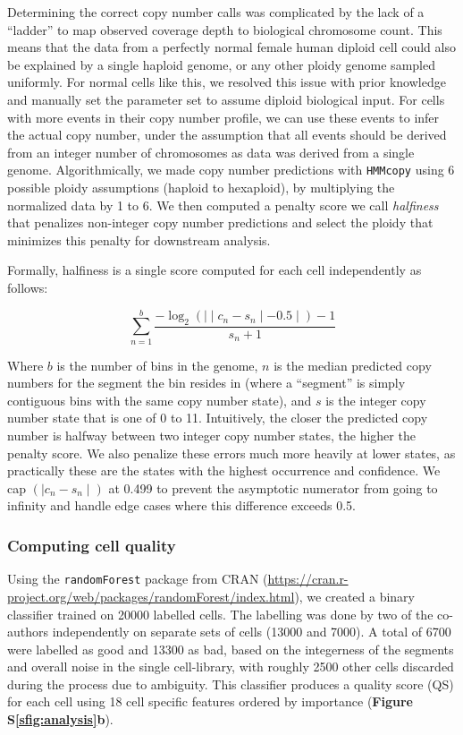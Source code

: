\documentclass{article}
\newcommand{\refsupfig}[2][]{\textbf{Figure S}\textbf{\ref{#2}}{#1}}
\begin{document}
Determining the correct copy number calls was complicated by the lack of a ``ladder'' to map observed coverage depth to biological chromosome count. This means that the data from a perfectly normal female human diploid cell could also be explained by a single haploid genome, or any other ploidy genome sampled uniformly. For normal cells like this, we resolved this issue with prior knowledge and manually set the parameter set to assume diploid biological input. For cells with more events in their copy number profile, we can use these events to infer the actual copy number, under the assumption that all events should be derived from an integer number of chromosomes as data was derived from a single genome. Algorithmically, we made copy number predictions with \texttt{HMMcopy} using 6 possible ploidy assumptions (haploid to hexaploid), by multiplying the normalized data by 1 to 6. We then computed a penalty score we call \textit{halfiness} that penalizes non-integer copy number predictions and select the ploidy that minimizes this penalty for downstream analysis.

Formally, halfiness is a single score computed for each cell independently as follows:

\begin{equation}
    \sum_{n = 1}^{b}{\frac{-\log_{2}(\mid\mid c_{n} - s_{n} \mid - 0.5\mid) - 1}{s_{n} + 1}}
\end{equation}

Where $b$ is the number of bins in the genome, $n$ is the median predicted copy numbers for the segment the bin resides in (where a ``segment'' is simply contiguous bins with the same copy number state), and $s$ is the integer copy number state that is one of 0 to 11. Intuitively, the closer the predicted copy number is halfway between two integer copy number states, the higher the penalty score. We also penalize these errors much more heavily at lower states, as practically these are the states with the highest occurrence and confidence. We cap $(\mid c_{n} - s_{n} \mid)$ at 0.499 to prevent the asymptotic numerator from going to infinity and handle edge cases where this difference exceeds 0.5.

\subsubsection*{Computing cell quality}

Using the \texttt{randomForest} package from CRAN (\url{https://cran.r-project.org/web/packages/randomForest/index.html}), we created a binary classifier trained on 20000 labelled cells. The labelling was done by two of the co-authors independently on separate sets of cells (13000 and 7000). A total of 6700 were labelled as good and 13300 as bad, based on the integerness of the segments and overall noise in the single cell-library, with roughly 2500 other cells discarded during the process due to ambiguity. This classifier produces a quality score (QS) for each cell using 18 cell specific features ordered by importance (\refsupfig{sfig:analysis}\textbf{b}).
\end{document}
